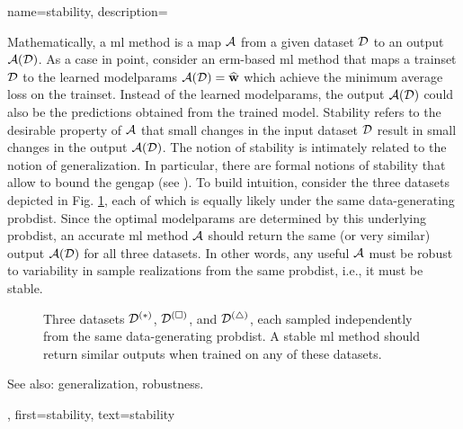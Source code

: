 {name={stability},
	description={
	Mathematically, a \gls{ml} method is a map $\mathcal{A}$ from a given \gls{dataset} $\mathcal{D}$ 
	to an output $\mathcal{A}(\mathcal{D})$. As a case in point, consider an \gls{erm}-based 
	\gls{ml} method that maps a \gls{trainset} $\mathcal{D}$ to the learned \glspl{modelparam} 
	$\mathcal{A}(\mathcal{D}) = \widehat{{\bf w}}$ which achieve the minimum average \gls{loss} 
	on the \gls{trainset}. Instead of the learned \glspl{modelparam}, the 
	output $\mathcal{A}(\mathcal{D})$ could also be the \glspl{prediction} obtained from 
	the trained \gls{model}. Stability refers to the desirable property 
	of $\mathcal{A}$ that small changes in the input \gls{dataset} $\mathcal{D}$ result in small 
	changes in the output $\mathcal{A}(\mathcal{D})$. The notion of stability is intimately related 
	to the notion of \gls{generalization}. In particular, there are formal notions of stability  
	that allow to bound the \gls{gengap} (see \cite[Ch.~13]{ShalevMLBook}).
		To build intuition, consider the three \glspl{dataset} depicted in Fig. \ref{fig_three_data_stability_dict}, each 
		of which is equally likely under the same \gls{data}-generating \gls{probdist}. Since the 
		optimal \glspl{modelparam} are determined by this underlying \gls{probdist}, an accurate 
		\gls{ml} method $\mathcal{A}$ should return the same (or very similar) output $\mathcal{A}(\mathcal{D})$ 
		for all three \glspl{dataset}. In other words, any useful $\mathcal{A}$ must be robust to 
		variability in \gls{sample} \glspl{realization} from the same \gls{probdist}, i.e., it must be stable. 
		\begin{figure}[H]
			\centering
			\caption{Three \glspl{dataset} $\mathcal{D}^{(*)}$, $\mathcal{D}^{(\square)}$, 
			and $\mathcal{D}^{(\triangle)}$, each sampled independently from the same 
			\gls{data}-generating \gls{probdist}. A stable \gls{ml} method should return 
			similar outputs when trained on any of these \glspl{dataset}. \label{fig_three_data_stability_dict}}
		\end{figure}
		See also: \gls{generalization}, \gls{robustness}.}, 
	first={stability}, 
	text={stability} 
}

